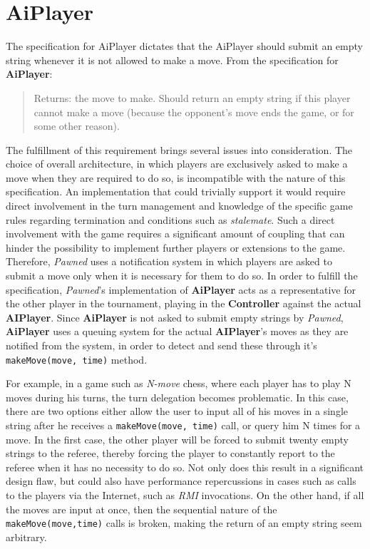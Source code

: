 
\section{AiPlayer}\label{AiPlayer}
  

The specification for AiPlayer dictates that the AiPlayer should submit an empty string whenever it is not allowed to make a move.
From the specification for \textbf{AiPlayer}: 

\begin{quotation}
Returns: the move to make. Should return an empty string if this player cannot make a move (because the opponent's move ends the game, 
or for some other reason).
\end{quotation} 

The fulfillment of this requirement brings several issues into consideration. The choice of overall architecture, in 
which players are exclusively asked to make a move when they are required to do so, is incompatible with the nature of 
this specification. An implementation that could trivially support it would require direct involvement in the 
turn management and knowledge of the specific game rules regarding termination and conditions such as \emph{stalemate}. 
Such a direct involvement with the game requires a significant amount of coupling that can hinder the possibility to implement 
further players or extensions to the game. Therefore, \emph{Pawned} uses a notification system in which players are asked
to submit a move only when it is necessary for them to do so. In order to fulfill the specification, \emph{Pawned}'s implementation
of \textbf{AiPlayer} acts as a representative for the other player in the tournament, playing in the \textbf{Controller} against
the actual \textbf{AIPlayer}. Since \textbf{AiPlayer} is not asked to submit empty strings by \emph{Pawned}, \textbf{AiPlayer}
uses a queuing system for the actual \textbf{AIPlayer}'s moves as they are notified from the system, in order 
to detect and send these through it's \texttt{makeMove(move, time)} method. 

For example, in a game such as \emph{N-move} chess, where each player has to play N moves during his turns, the turn delegation becomes 
problematic. In this case, there are two options either allow the user to input all of his moves in a single string after he receives a 
\texttt{makeMove(move, time)} call, or query him N times for a move. In the first case, the other player will be forced to submit twenty
empty strings to the referee, thereby forcing the player to constantly report to the referee when it has no necessity to do so. Not only 
does this result in a significant design flaw, but could also have performance repercussions in cases such as calls to the players
via the Internet, such as \emph{RMI} invocations. On the other hand, if all the moves are input at once, then the sequential nature of the
\texttt{makeMove(move,time)} calls is broken, making the return of an empty string seem arbitrary. 

